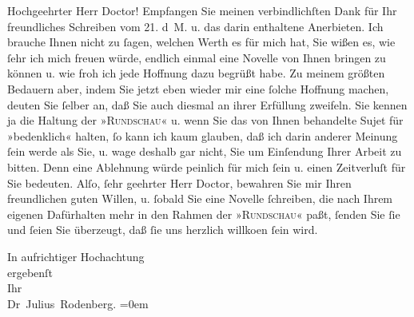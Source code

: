 \pstart{}Hochgeehrter Herr Doctor!\pend\vspace{0.5em}
\pstart
           Empfangen Sie meinen verbindlichſten Dank für Ihr freundliches Schreiben vom
                  21. d M. u. das darin enthaltene Anerbieten. Ich brauche Ihnen nicht
               zu{ }ſagen, welchen Werth es für mich hat, Sie wißen es, wie{ }ſehr ich mich freuen
               würde, endlich einmal eine Novelle von Ihnen bringen zu können u. wie froh ich jede Hoffnung dazu
               begrüßt habe. Zu meinem größten Bedauern aber, indem Sie jetzt eben wieder mir eine{ }ſolche Hoffnung machen, deuten Sie{ }ſelber an, daß Sie auch diesmal an ihrer Erfüllung
               zweifeln. Sie kennen ja die Haltung der »\textsc{Rundschau}« u. wenn Sie das von Ihnen behandelte Sujet für »bedenklich« halten,{ }ſo kann
               ich kaum glauben, daß ich darin anderer Meinung{ }ſein werde als Sie, u. wage deshalb
                  {\pb}gar nicht, Sie um
               Einſendung Ihrer Arbeit zu
               bitten. Denn eine Ablehnung würde peinlich für mich{ }ſein u. einen Zeitverluſt für Sie
               bedeuten. Alſo,{ }ſehr geehrter Herr Doctor, bewahren Sie mir Ihren freundlichen guten
               Willen, u.{ }ſobald Sie eine Novelle{ }ſchreiben, die nach Ihrem eigenen Dafürhalten mehr
               in den Rahmen der »\textsc{Rundschau}« paßt,{ }ſenden Sie{ }ſie und{ }ſeien Sie überzeugt, daß{ }ſie uns herzlich willko{\geminationm}en{ }ſein wird.\pend
           
\pstart
           In aufrichtiger Hochachtung{\\[\baselineskip]}ergebenſt{\\[\baselineskip]}Ihr{\\[\baselineskip]}\spacefill\mbox{Dr Julius Rodenberg.}\pend
           \leftskip=0em{}\endnumbering{}  \newcommand{\dateiname}{L01049}\newcommand{\titel}{Julius Rodenberg an Arthur Schnitzler, 23. 6. 1900}\newcommand{\editorInnen}{Martin Anton Müller und Gerd-Hermann Susen}
